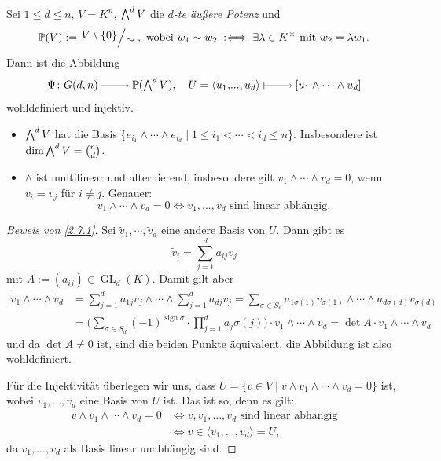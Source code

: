 \documentclass[a4paper,12pt,index=toc]{scrbook}
\theoremstyle{keinenummern} %
\def\P{\mathbb{P}}
\newcommand{\GL}{\operatorname{GL}}
\newcommand{\sign}{\operatorname{sign}}
\renewcommand{\dotsc}{\ensuremath{\!...}}
\newcommand{\schlange}[1]{\widetilde{#1}}
\let\grassmann\bigwedge
\def\bigwedge{\begingroup\textstyle\grassmann\endgroup}
\begin{document}
\begin{db}\label{2.7.1}
Sei $1\leq d\leq n$, $V=K^{n}$, $\bigwedge^{d}V$ die \emph{$d$-te äußere Potenz} und
\[\P(V):=\Quotient{V\setminus\{0\}}{\sim},\text{ wobei }w_{1}\sim w_{2}\; :\Longleftrightarrow\;\exists\lambda\in K^{\times}\text{ mit }w_{2}=\lambda w_{1}.\]
Dann ist die Abbildung
\[\Psi\colon G(d,n)\ra\P(\bigwedge^{d}V),\quad U=\langle u_{1},\dotsc,u_{d}\rangle\mapsto\relax [u_{1}\wedge\dotsm\wedge u_{d}]\]
wohldefiniert und injektiv.
\end{db}

\begin{nerinnerung}\begin{itemize}[leftmargin=*,labelindent=\parindent]
\item $\bigwedge^{d}V$ hat die Basis $\{e_{i_{1}}\wedge\dotsm\wedge e_{i_{d}}\mid 1\leq i_{1}<\dotsm<i_{d}\leq n\}$.
Insbesondere ist $\dim\bigwedge^{d}V=\binom{n}{d}$.
%
\item $\wedge$ ist multilinear und alternierend, insbesondere gilt $v_{1}\wedge\dotsm\wedge v_{d}=0$, wenn $v_{i}=v_{j}$ für $i\neq j$. Genauer:
\[v_{1}\wedge\dotsm\wedge v_{d}=0\iff v_{1},\dotsc, v_{d}\text{ sind linear abhängig.}\]
\end{itemize}\end{nerinnerung}

\begin{proof}[Beweis von \cref{2.7.1}]
Sei $\schlange{v}_{1},\dotsm,\schlange{v}_{d}$ eine andere Basis von $U$. Dann gibt es
\[\schlange{v}_{i}=\sum_{j=1}^{d}a_{ij}v_{j}\]
mit $A:=(a_{ij})\in\GL_{d}(K)$. Damit gilt aber
\begin{align*}
\schlange{v}_{1}\wedge\dotsm\wedge\schlange{v}_{d}&=\sum_{j=1}^{d}a_{1j}v_{j}\wedge\dotsm\wedge\sum_{j=1}^{d}a_{dj}v_{j}=\sum_{\sigma\in S_{d}}a_{1\sigma(1)}v_{\sigma(1)}\wedge\dotsm\wedge a_{d\sigma(d)}v_{\sigma(d)}\\
&=\biggl(\sum_{\sigma\in S_{d}}(-1)^{\sign\sigma}\cdot\prod_{j=1}^{d}a_{j}\sigma(j)\biggr)\cdot v_{1}\wedge\dotsm\wedge v_{d}=\det A\cdot v_{1}\wedge\dotsm\wedge v_{d}
\end{align*}
und da $\det A\neq 0$ ist, sind die beiden Punkte äquivalent, die Abbildung ist also wohldefiniert.

Für die Injektivität überlegen wir uns, dass $U=\{v\in V\mid v\wedge v_{1}\wedge\dotsm\wedge v_{d}=0\}$ ist, wobei $v_{1},\dotsc, v_{d}$ eine Basis von $U$ ist. Das ist so, denn es gilt:
\begin{align*}
v\wedge v_{1}\wedge\dotsm\wedge v_{d}=0&\iff v,v_{1},\dotsc,v_{d}\text{ sind linear abhängig}\\
&\iff v\in\langle v_{1},\dotsc,v_{d}\rangle=U,
\end{align*}
da $v_{1},\dotsc,v_{d}$ als Basis linear unabhängig sind.
\end{proof}
\end{document}
